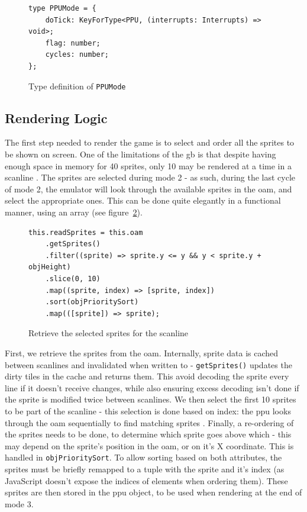 \documentclass[11pt]{informatics-report}
\begin{document}
\begin{figure}[h]
    \begin{verbatim}
type PPUMode = {
    doTick: KeyForType<PPU, (interrupts: Interrupts) => void>;
    flag: number;
    cycles: number;
};
    \end{verbatim}
    \caption{Type definition of \texttt{PPUMode}}
    \label{fig:stat-mode-type}
\end{figure}

\subsection{Rendering Logic}

The first step needed to render the game is to select and order all the sprites to be shown on screen. One of the limitations of the \gls{gb} is that despite having enough space in memory for 40 sprites, only 10 may be rendered at a time in a scanline \cite[OAM]{pandoc}. The sprites are selected during mode 2 - as such, during the last cycle of mode 2, the emulator will look through the available sprites in the \gls{oam}, and select the appropriate ones. This can be done quite elegantly in a functional manner, using an array (see figure~\ref{fig:sprite-select}).

\begin{figure}[h]
    \begin{verbatim}
this.readSprites = this.oam
    .getSprites()
    .filter((sprite) => sprite.y <= y && y < sprite.y + objHeight)
    .slice(0, 10)
    .map((sprite, index) => [sprite, index])
    .sort(objPrioritySort)
    .map(([sprite]) => sprite);
    \end{verbatim}
    \caption{Retrieve the selected sprites for the scanline}
    \label{fig:sprite-select}
\end{figure}

First, we retrieve the sprites from the \gls{oam}. Internally, sprite data is cached between scanlines and invalidated when written to - \texttt{getSprites()} updates the dirty tiles in the cache and returns them. This avoid decoding the sprite every line if it doesn't receive changes, while also ensuring excess decoding isn't done if the sprite is modified twice between scanlines. We then select the first 10 sprites to be part of the scanline - this selection is done based on index: the \gls{ppu} looks through the \gls{oam} sequentially to find matching sprites \cite[OAM]{pandoc}. Finally, a re-ordering of the sprites needs to be done, to determine which sprite goes above which - this may depend on the sprite's position in the \gls{oam}, or on it's X coordinate. This is handled in \texttt{objPrioritySort}. To allow sorting based on both attributes, the sprites must be briefly remapped to a tuple with the sprite and it's index (as JavaScript doesn't expose the indices of elements when ordering them). These sprites are then stored in the \gls{ppu} object, to be used when rendering at the end of mode 3.
\end{document}
